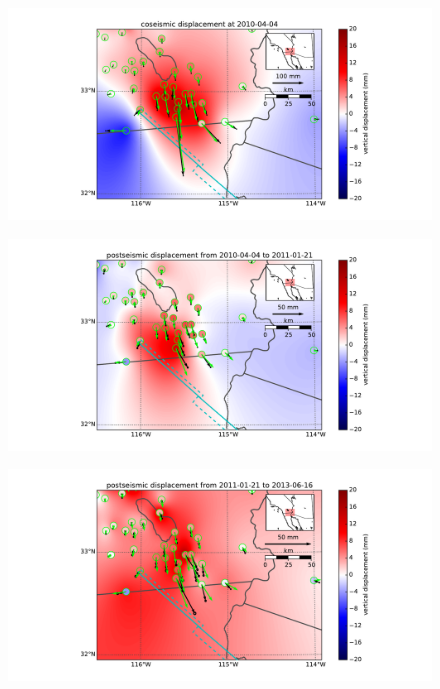 \documentclass[12pt]{article}
\begin{document}
\begin{figure}
\includegraphics[scale=0.6]{Figures/near_field_data_1}
\centering 
\caption{}
\label{nearfield1}
\end{figure}
\begin{figure}
\includegraphics[scale=0.6]{Figures/near_field_data_2}
\centering 
\caption{}
\label{nearfield2}
\end{figure}
\begin{figure}
\includegraphics[scale=0.6]{Figures/near_field_data_3}
\centering 
\caption{}
\label{nearfield3}
\end{figure}
\end{document}
